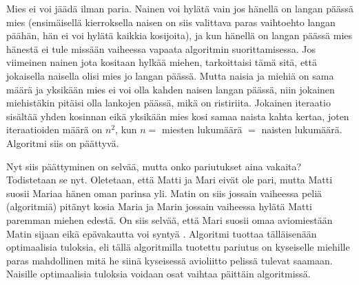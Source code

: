 \documentclass[finnish]{tktltiki2}
\theoremstyle{definition}
\theoremstyle{remark}
\begin{document}
Mies ei voi jäädä ilman paria. Nainen voi hylätä vain jos hänellä on langan päässä mies (ensimäisellä kierroksella naisen on siis valittava paras vaihtoehto langan päähän, hän ei voi hylätä kaikkia kosijoita), ja kun hänellä on langan päässä mies hänestä ei tule missään vaiheessa vapaata algoritmin suorittamisessa.
Jos viimeinen nainen jota kositaan hylkää miehen, tarkoittaisi tämä sitä, että jokaisella naisella olisi mies jo langan päässä. Mutta naisia ja miehiä on sama määrä ja yksikään mies ei voi olla kahden naisen langan päässä, niin jokainen miehistäkin pitäisi olla lankojen päässä, mikä on ristiriita.
Jokainen iteraatio sisältää yhden kosinnan eikä yksikään mies kosi samaa naista kahta kertaa, joten iteraatioiden määrä on $n^2$, kun $n = $ miesten lukumäärä $ = $ naisten lukumäärä. Algoritmi siis on päättyvä.

Nyt siis päättyminen on selvää, mutta onko pariutukset aina vakaita? Todistetaan se nyt.
Oletetaan, että Matti ja Mari eivät ole pari, mutta Matti suosii Mariaa hänen oman parinsa yli. Matin on siis jossain vaiheessa peliä (algoritmiä) pitänyt kosia Maria ja Marin jossain vaiheessa hylätä Matti paremman miehen edestä. On siis selvää, että Mari suosii omaa aviomiestään Matin sijaan eikä epävakautta voi syntyä \cite[p. 588]{gale62a}.
Algoritmi tuottaa tälläisenään optimaalisia tuloksia, eli tällä algoritmilla tuotettu pariutus on kyseiselle miehille paras mahdollinen mitä he siinä kyseisessä avioliitto pelissä tulevat saamaan.
Naisille optimaalisia tuloksia voidaan osat vaihtaa päittäin algoritmissä.




%
%
% 
%



\end{document}
